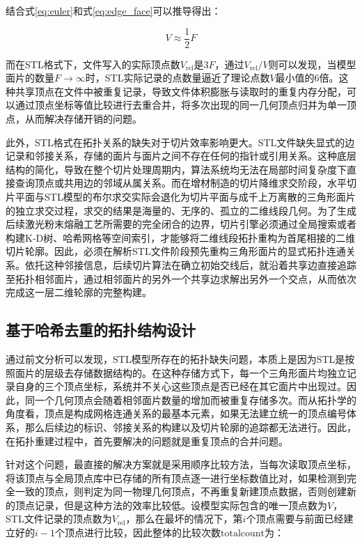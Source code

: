 结合式\eqref{eq:euler}和式\eqref{eq:edge_face}可以推导得出：

\begin{equation}
V\approx \frac{1}{2}F \label{eq:vertex_face}
\end{equation}

而在STL格式下，文件写入的实际顶点数$V_{\mathrm{rel}}$是$3F$，通过$V_{\mathrm{rel}}/V$则可以发现，当模型面片的数量$F\to\infty$时，STL实际记录的点数量逼近了理论点数$V$最小值的6倍。这种共享顶点在文件中被重复记录，导致文件体积膨胀与读取时的重复内存分配，可以通过顶点坐标等值比较进行去重合并，将多次出现的同一几何顶点归并为单一顶点，从而解决存储开销的问题。

此外，STL格式在拓扑关系的缺失对于切片效率影响更大。STL文件缺失显式的边记录和邻接关系，存储的面片与面片之间不存在任何的指针或引用关系。这种底层结构的简化，导致在整个切片处理周期内，算法系统均无法在局部时间复杂度下直接查询顶点或共用边的邻域从属关系。而在增材制造的切片降维求交阶段，水平切片平面与STL模型的布尔求交实际会退化为切片平面与成千上万离散的三角形面片的独立求交过程，求交的结果是海量的、无序的、孤立的二维线段几何。为了生成后续激光粉末熔融工艺所需要的完全闭合的边界，切片引擎必须通过全局搜索或者构建K-D树、哈希网格等空间索引，才能够将二维线段拓扑重构为首尾相接的二维切片轮廓。因此，必须在解析STL文件阶段预先重构三角形面片的显式拓扑连通关系。依托这种邻接信息，后续切片算法在确立初始交线后，就沿着共享边直接追踪至拓扑相邻面片，通过相邻面片的另外一个共享边求解出另外一个交点，从而依次完成这一层二维轮廓的完整构建。

\subsection{基于哈希去重的拓扑结构设计}

通过前文分析可以发现，STL模型所存在的拓扑缺失问题，本质上是因为STL是按照面片的层级去存储数据结构的。在这种存储方式下，每一个三角形面片均独立记录自身的三个顶点坐标，系统并不关心这些顶点是否已经在其它面片中出现过。因此，同一个几何顶点会随着相邻面片数量的增加而被重复存储多次。而从拓扑学的角度看，顶点是构成网格连通关系的最基本元素，如果无法建立统一的顶点编号体系，那么后续边的标识、邻接关系的构建以及切片轮廓的追踪都无法进行。因此，在拓扑重建过程中，首先要解决的问题就是重复顶点的合并问题。

针对这个问题，最直接的解决方案就是采用顺序比较方法，当每次读取顶点坐标，将该顶点与全局顶点库中已存储的所有顶点逐一进行坐标数值比对，如果检测到完全一致的顶点，则判定为同一物理几何顶点，不再重复新建顶点数据，否则创建新的顶点记录，但是这种方法的效率比较低。设模型实际包含的唯一顶点数为$V$，STL文件记录的顶点数为$V_{\mathrm{rel}}$，那么在最坏的情况下，第$i$个顶点需要与前面已经建立好的$i-1$个顶点进行比较，因此整体的比较次数$\mathrm{totalcount}$为：

